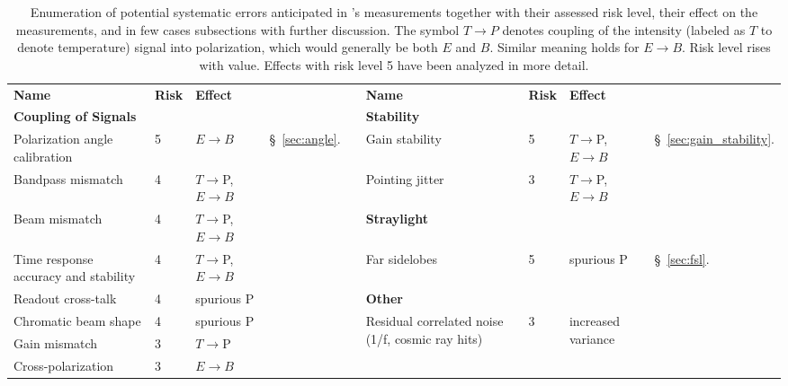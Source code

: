 \begin{table}[h!]
\hspace{-0.1in}
\centering
\scriptsize
 \begin{tabular}{p{4.2cm} p{0.5cm} p{1.4cm} p{1.0cm} p{0.04cm} p{2.8cm} p{0.5cm} p{1.4cm} p{1.0cm}}
 \cline{1-4} \cline{6-9}
\textbf{Name} & \textbf{Risk}&\textbf{Effect} & &  & \textbf{Name} & \textbf{Risk}&\textbf{Effect} \\
 \cline{1-4} \cline{6-9}
\textbf{Coupling of Signals}& & & & &   \textbf{Stability} & & \\    
Polarization angle calibration\dotfill&
5&
$E{\to}B$ &
\S~\ref{sec:angle}. & &
Gain stability\dotfill&
5&
$T{\to}$P, $E{\to} B$
&
\S~\ref{sec:gain_stability}.
\\
 Bandpass mismatch\dotfill&
 4&
$T{\to}$P, $E{\to}B$ & & &
Pointing jitter\dotfill&
3&
$T{\to}$P, $E{\to}B$
   \\
\cline{6-9}
Beam mismatch\dotfill&
4&
$T{\to}$P, $E{\to}B$ & &
& %
\textbf{Straylight}& & 
\\
Time response accuracy and stability\dotfill&
4&
$T{\to}$P, $E{\to}B$ & & & 
Far sidelobes\dotfill&
5&
spurious P
&
\S~\ref{sec:fsl}.
\\
\cline{6-9}
Readout cross-talk\dotfill&
4&
spurious P & & &
\textbf{Other} 
\\
Chromatic beam shape\dotfill&
4&
spurious P & & &
\multirow{2}{3.3cm}{Residual correlated noise (1/f, cosmic ray hits)\dotfill}&
3 &
\multirow{2}{1.4cm}{increased variance}
\\
Gain mismatch\dotfill&
3&
$T{\to}$P
\\
Cross-polarization\dotfill&
3&
$E{\to}B$
\\
\cline{1-4}
\cline{6-9}
 \end{tabular}

\hspace{-0.0in}

\caption{\captiontext
Enumeration of potential systematic errors anticipated in \pico's measurements together with their assessed risk level,
their effect on the measurements, and in few cases subsections with further discussion. The symbol $T \rightarrow P $ denotes coupling of the intensity (labeled as $T$ to denote temperature) signal into polarization, which would generally be both $E$ and $B$. Similar meaning holds for $E \rightarrow B$. Risk level rises with value. Effects with risk level 5 have been analyzed in more detail.
\label{tbl:SystematicsList2col} }
\hspace{-0.0in}
\end{table}
